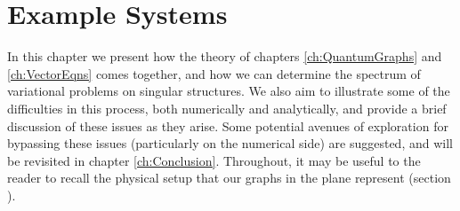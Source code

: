 \chapter{Example Systems} \label{ch:ExampleSystems}
In this chapter we present how the theory of chapters \ref{ch:QuantumGraphs} and \ref{ch:VectorEqns} comes together, and how we can determine the spectrum of variational problems on singular structures.
We also aim to illustrate some of the difficulties in this process, both numerically and analytically, and provide a brief discussion of these issues as they arise.
Some potential avenues of exploration for bypassing these issues (particularly on the numerical side) are suggested, and will be revisited in chapter \ref{ch:Conclusion}. 
Throughout, it may be useful to the reader to recall the physical setup that our graphs in the plane represent (section ).

